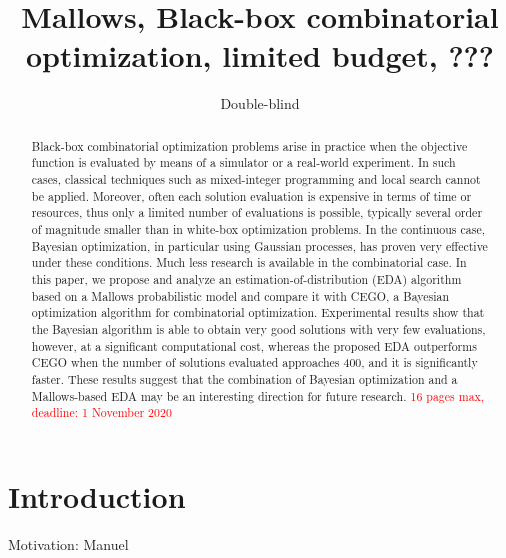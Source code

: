 \documentclass[runningheads]{llncs}
\title{Mallows, Black-box combinatorial optimization, limited budget,  ???}
\author{Double-blind}
\date{}%
\begin{document}
\maketitle

\begin{abstract}
  Black-box combinatorial optimization problems arise in practice when the
  objective function is evaluated by means of a simulator or a real-world
  experiment. In such cases, classical techniques such as mixed-integer
  programming and local search cannot be applied. Moreover, often each solution
  evaluation is expensive in terms of time or resources, thus only a limited
  number of evaluations is possible, typically several order of magnitude
  smaller than in white-box optimization problems. In the continuous case,
  Bayesian optimization, in particular using Gaussian processes, has proven
  very effective under these conditions. Much less research is available in the
  combinatorial case. In this paper, we propose and analyze an
  estimation-of-distribution (EDA) algorithm based on a Mallows probabilistic
  model and compare it with CEGO, a Bayesian optimization algorithm for
  combinatorial optimization. Experimental results show that the Bayesian
  algorithm is able to obtain very good solutions with very few evaluations,
  however, at a significant computational cost, whereas the proposed EDA
  outperforms CEGO when the number of solutions evaluated approaches 400, and
  it is significantly faster. These results suggest that the combination of
  Bayesian optimization and a Mallows-based EDA may be an interesting direction
  for future research.\sloppy  
\textcolor{red}{16 pages max, deadline: 1 November 2020}
\end{abstract}

\section{Introduction}

Motivation: Manuel
\end{document}
